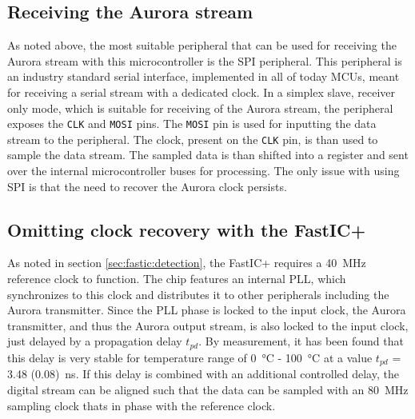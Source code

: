\subsection{Receiving the Aurora stream}
As noted above, the most suitable peripheral that can be used for receiving the Aurora stream with this microcontroller is the SPI peripheral. This peripheral is an industry standard serial interface, implemented in all of today MCUs, meant for receiving a serial stream with a dedicated clock. In a simplex slave, receiver only mode, which is suitable for receiving of the Aurora stream, the peripheral exposes the \verb|CLK| and \verb|MOSI| pins. The \verb|MOSI| pin is used for inputting the data stream to the peripheral. The clock, present on the \verb|CLK| pin, is than used to sample the data stream. The sampled data is than shifted into a register and sent over the internal microcontroller buses for processing. The only issue with using SPI is that the need to recover the Aurora clock persists.

\subsection{Omitting clock recovery with the FastIC+}
As noted in section \ref{sec:fastic:detection}, the FastIC+ requires a \SI{40}{\mega\hertz} reference clock to function. The chip features an internal PLL, which synchronizes to this clock and distributes it to other peripherals including the Aurora transmitter. Since the PLL phase is locked to the input clock, the Aurora transmitter, and thus the Aurora output stream, is also locked to the input clock, just delayed by a propagation delay $t_{pd}$. By measurement, it has been found that this delay is very stable for temperature range of \SI{0}{\celsius} - \SI{100}{\celsius} at a value $t_{pd}$ = \SI{3.48 (0.08)}{\nano\second}. If this delay is combined with an additional controlled delay, the digital stream can be aligned such that the data can be sampled with an \SI{80}{\mega\hertz} sampling clock thats in phase with the reference clock. 

